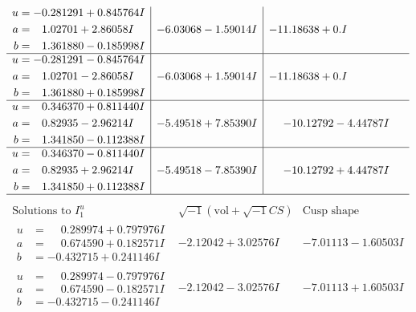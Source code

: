 \documentclass[1p]{elsarticle_modified}
\theoremstyle{definition}
\newcommand{\I}{\sqrt{-1}}
\begin{document}
$$\begin{array}{c|c|c}
\begin{aligned}
u &= -0.281291 + 0.845764 I \\
a &= \phantom{-}1.02701 + 2.86058 I \\
b &= \phantom{-}1.361880 - 0.185998 I\end{aligned}
 & -6.03068 - 1.59014 I & -11.18638 + 0. I\phantom{ +0.000000I} \\ \hline\begin{aligned}
u &= -0.281291 - 0.845764 I \\
a &= \phantom{-}1.02701 - 2.86058 I \\
b &= \phantom{-}1.361880 + 0.185998 I\end{aligned}
 & -6.03068 + 1.59014 I & -11.18638 + 0. I\phantom{ +0.000000I} \\ \hline\begin{aligned}
u &= \phantom{-}0.346370 + 0.811440 I \\
a &= \phantom{-}0.82935 - 2.96214 I \\
b &= \phantom{-}1.341850 - 0.112388 I\end{aligned}
 & -5.49518 + 7.85390 I & -10.12792 - 4.44787 I \\ \hline\begin{aligned}
u &= \phantom{-}0.346370 - 0.811440 I \\
a &= \phantom{-}0.82935 + 2.96214 I \\
b &= \phantom{-}1.341850 + 0.112388 I\end{aligned}
 & -5.49518 - 7.85390 I & -10.12792 + 4.44787 I\\
 \hline 
 \end{array}$$\newpage$$\begin{array}{c|c|c}  
\text{Solutions to }I^u_{1}& \I (\text{vol} + \sqrt{-1}CS) & \text{Cusp shape}\\
 \hline 
\begin{aligned}
u &= \phantom{-}0.289974 + 0.797976 I \\
a &= \phantom{-}0.674590 + 0.182571 I \\
b &= -0.432715 + 0.241146 I\end{aligned}
 & -2.12042 + 3.02576 I & -7.01113 - 1.60503 I \\ \hline\begin{aligned}
u &= \phantom{-}0.289974 - 0.797976 I \\
a &= \phantom{-}0.674590 - 0.182571 I \\
b &= -0.432715 - 0.241146 I\end{aligned}
 & -2.12042 - 3.02576 I & -7.01113 + 1.60503 I \\ \hline\begin{aligned}

\end{aligned}
\end{array}$$
\end{document}
